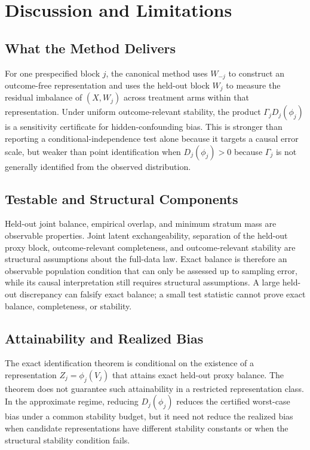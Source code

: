 \section{Discussion and Limitations}
\label{sec:discussion}

\subsection{What the Method Delivers}

For one prespecified block $j$, the canonical method uses $W_{-j}$ to construct an outcome-free representation and uses the held-out block $W_j$ to measure the residual imbalance of $(X,W_j)$ across treatment arms within that representation. Under uniform outcome-relevant stability, the product $\Gamma_jD_j(\phi_j)$ is a sensitivity certificate for hidden-confounding bias. This is stronger than reporting a conditional-independence test alone because it targets a causal error scale, but weaker than point identification when $D_j(\phi_j)>0$ because $\Gamma_j$ is not generally identified from the observed distribution.

\subsection{Testable and Structural Components}

Held-out joint balance, empirical overlap, and minimum stratum mass are observable properties. Joint latent exchangeability, separation of the held-out proxy block, outcome-relevant completeness, and outcome-relevant stability are structural assumptions about the full-data law. Exact balance is therefore an observable population condition that can only be assessed up to sampling error, while its causal interpretation still requires structural assumptions. A large held-out discrepancy can falsify exact balance; a small test statistic cannot prove exact balance, completeness, or stability.

\subsection{Attainability and Realized Bias}

The exact identification theorem is conditional on the existence of a representation $Z_j=\phi_j(V_j)$ that attains exact held-out proxy balance. The theorem does not guarantee such attainability in a restricted representation class. In the approximate regime, reducing $D_j(\phi_j)$ reduces the certified worst-case bias under a common stability budget, but it need not reduce the realized bias when candidate representations have different stability constants or when the structural stability condition fails.

